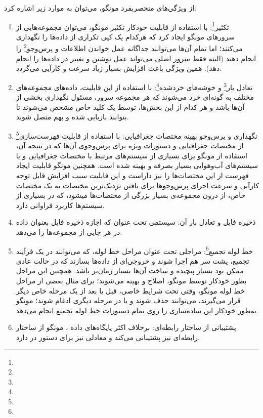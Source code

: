 از ویژگی‌های منحصربفرد مونگو، می‌توان به موارد زیر اشاره کرد\cite{wiki:mongo}:
\begin{enumerate}
	\item تکثیر\footnote{}: با استفاده از قابلیت خودکار تکثیر مونگو، می‌توان مجموعه‌هایی از سرورهای مونگو ایجاد کرد که هرکدام یک کپی تکراری از داده‌ها را نگهداری می‌کنند؛ اما تمام آن‌ها می‌توانند جداگانه عمل خواندن اطلاعات و پرس‌وجو\footnote{} را انجام دهند (البته فقط سرور اصلی می‌تواند عمل نوشتن و تغییر در داده‌ها را انجام دهد). همین ویژگی باعث افزایش بسیار زیاد سرعت و کارآیی می‌گردد.
	\item تعادل بار\footnote{} و خوشه‌های خردشده\footnote{}: با استفاده از این قابلیت، داده‌های مجموعه‌های مختلف به گونه‌ای خرد می‌شوند که هر مجموعه سرور، مسئول نگهداری بخشی از آن‌ها باشد و هر کدام از این بخش‌ها، توسط یک کلید خاص مشخص می‌شوند تا بتوانند بازیابی شده و بهم متصل شوند. 
	\item نگهداری و پرس‌وجو بهینه مختصات جغرافیایی: با استفاده از قابلیت فهرست‌سازی\footnote{} از مختصات جغرافیایی و دستورات ویژه برای پرس‌وجوی آن‌ها که در نتیجه آن، استفاده از مونگو برای بسیاری از سیستم‌های مرتبط با مختصات جغرافیایی و یا سیستم‌های آب‌وهوایی بسیار بصرفه و بهینه شده است. همچنین مونگو قابلیت ایجاد فهرست از این مختصات‌ها را نیز داراست و این قابلیت سبب افزایش قابل توجه کارآیی و سرعت اجرای پرس‌وجوها برای یافتن نزدیک‌ترین مختصات به یک مختصات خاص، از درون مجموعه‌ی بسیار بزرگی از مختصات‌ها می‍شود، که در بسیاری از سیستم‌ها کاربرد فراوانی دارد.
	\item ذخیره فایل و تعادل بار آن: سیستمی تحت عنوان  که اجازه ذخیره فایل بعنوان داده در هر جایی از مجموعه‌ها را می‌دهد.
	\item خط لوله تجمیع\footnote{}: مراحلی تحت عنوان مراحل خط لوله، که می‌توانند در یک فرآیند تجمیع، پشت سر هم اجرا شوند و خروجی‌ای از داده‌ها بسازند که در حالت عادی ممکن بود بسیار پیچیده و ساخت آن‌ها بسیار زمان‌بر باشد. همچنین این مراحل بطور خودکار توسط مونگو، اصلاح و بهینه می‌شوند؛ برای مثال بعضی از مراحل خط لوله مونگو، وقتی تحت شرایط خاصی، قبل یا بعد از یک مرحله خاص دیگر قرار می‌گیرند، می‌توانند حذف شوند و یا در مرحله دیگری ادغام شوند؛ مونگو به‌طور خودکار این ساده‌سازی را روی تمام دستورات خط لوله تجمیع انجام می‌دهد.
	\item پشتیبانی از ساختار رابطه‌ای: برخلاف اکثر پایگاه‌های داده ، مونگو از ساختار رابطه‌ای نیز پشتیبانی می‌کند و معادلی نیز برای دستور  در  دارد.
\end{enumerate}


